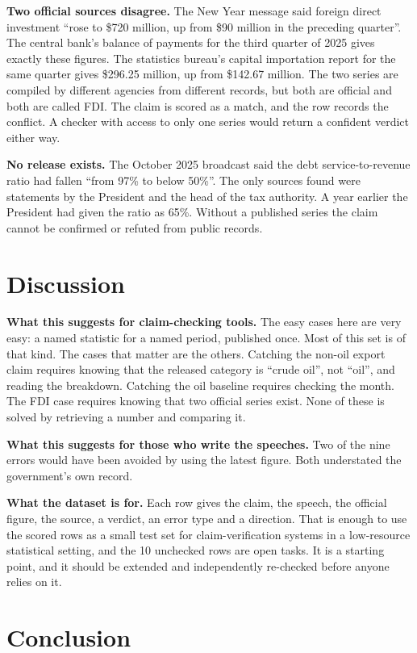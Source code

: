 \documentclass[11pt]{article}
\begin{document}
\textbf{Two official sources disagree.} The New Year message said foreign direct investment ``rose to \$720 million, up from \$90 million in the preceding quarter''. The central bank's balance of payments for the third quarter of 2025 gives exactly these figures. The statistics bureau's capital importation report for the same quarter gives \$296.25 million, up from \$142.67 million. The two series are compiled by different agencies from different records, but both are official and both are called FDI. The claim is scored as a match, and the row records the conflict. A checker with access to only one series would return a confident verdict either way.

\textbf{No release exists.} The October 2025 broadcast said the debt service-to-revenue ratio had fallen ``from 97\% to below 50\%''. The only sources found were statements by the President and the head of the tax authority. A year earlier the President had given the ratio as 65\%. Without a published series the claim cannot be confirmed or refuted from public records.

\section{Discussion}

\textbf{What this suggests for claim-checking tools.} The easy cases here are very easy: a named statistic for a named period, published once. Most of this set is of that kind. The cases that matter are the others. Catching the non-oil export claim requires knowing that the released category is ``crude oil'', not ``oil'', and reading the breakdown. Catching the oil baseline requires checking the month. The FDI case requires knowing that two official series exist. None of these is solved by retrieving a number and comparing it.

\textbf{What this suggests for those who write the speeches.} Two of the nine errors would have been avoided by using the latest figure. Both understated the government's own record.

\textbf{What the dataset is for.} Each row gives the claim, the speech, the official figure, the source, a verdict, an error type and a direction. That is enough to use the scored rows as a small test set for claim-verification systems in a low-resource statistical setting, and the 10 unchecked rows are open tasks. It is a starting point, and it should be extended and independently re-checked before anyone relies on it.

\section{Conclusion}
\end{document}
